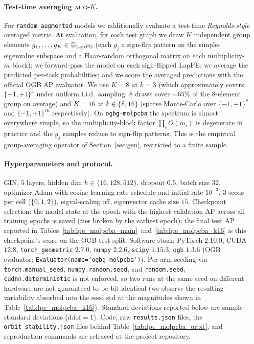 \paragraph{Test-time averaging \textsc{aug-$K$}.}
For \texttt{random\_augmented} models we additionally evaluate a
test-time \emph{Reynolds-style} averaged metric. At evaluation, for
each test graph we draw $K$ independent group elements
$g_1,\ldots,g_K \in \mathbb{G}_{\mathrm{LapPE}}$ (each $g_j$ a sign-flip pattern
on the simple-eigenvalue subspace and a Haar-random orthogonal matrix
on each multiplicity-$m$ block); we forward-pass the model on each
sign-flipped LapPE; we average the predicted per-task probabilities;
and we score the averaged predictions with the official OGB AP
evaluator. We use $K\!=\!8$ at $k\!=\!3$ (which approximately covers
$\{-1,+1\}^{3}$ under uniform i.i.d.\ sampling: $8$ draws cover
$\sim\!65\%$ of the $8$-element group on average) and $K\!=\!16$ at
$k\!\in\!\{8,16\}$ (sparse Monte-Carlo over $\{-1,+1\}^{8}$ and
$\{-1,+1\}^{16}$ respectively). On \texttt{ogbg-molpcba} the
spectrum is almost everywhere simple, so the
multiplicity-block factor $\prod_i O(m_i)$ is degenerate in
practice and the $g_j$ samples reduce to sign-flip patterns.
This is the empirical group-averaging operator of
Section~\ref{sec:gen}, restricted to a finite sample.

\paragraph{Hyperparameters and protocol.}
GIN, $5$ layers, hidden dim $h\!\in\!\{16,128,512\}$, dropout $0.5$,
batch size $32$, optimizer Adam with cosine learning-rate schedule and
initial rate $10^{-3}$, $3$ seeds per cell ($\{0,1,2\}$),
eigval-scaling off, eigenvector cache size $15$. Checkpoint selection:
the model state at the epoch with the highest validation AP across
all training epochs is saved (ties broken by the earliest epoch); the final test AP reported in
Tables~\ref{tab:lpe_molpcba_main}~and~\ref{tab:lpe_molpcba_k16} is
this checkpoint's score on the OGB test split. Software stack:
PyTorch $2.10.0$, CUDA $12.8$, \texttt{torch\_geometric} $2.7.0$,
\texttt{numpy} $2.2.6$, \texttt{scipy} $1.15.3$, \texttt{ogb} $1.3.6$
(OGB evaluator: \texttt{Evaluator(name=`ogbg-molpcba')}). Per-arm
seeding via \texttt{torch.manual\_seed}, \texttt{numpy.random.seed},
and \texttt{random.seed}; \texttt{cudnn.deterministic} is not
enforced, so two runs at the same seed on different hardware are not
guaranteed to be bit-identical (we observe the resulting variability
absorbed into the seed std at the magnitudes shown in
Table~\ref{tab:lpe_molpcba_k16}). Standard deviations reported below
are sample standard deviations ($\mathrm{ddof}\!=\!1$). Code, raw
\texttt{results.json} files, the \texttt{orbit\_stability.json} files
behind Table~\ref{tab:lpe_molpcba_orbit}, and reproduction commands
are released at the project repository.

